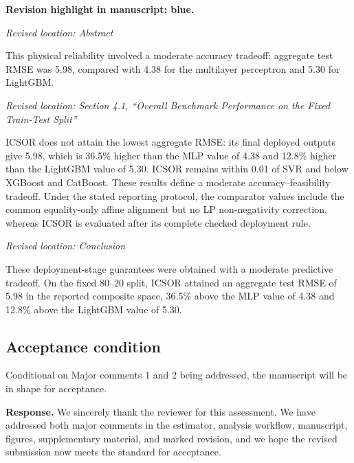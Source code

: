 \documentclass[11pt,a4paper]{article}
\newcommand{\revisionnotice}{\par\noindent\textcolor{revisionblue}{\textbf{Revision highlight in manuscript: blue.}}\par}
\newcommand{\excerptlocation}[1]{\par\noindent\textit{Revised location: #1}\par}
\begin{document}
\revisionnotice

\excerptlocation{Abstract}
\begin{revisionexcerpt}
This physical reliability involved a moderate accuracy tradeoff: aggregate test RMSE was 5.98, compared with 4.38 for the multilayer perceptron and 5.30 for LightGBM.
\end{revisionexcerpt}

\excerptlocation{Section 4.1, ``Overall Benchmark Performance on the Fixed Train-Test Split''}
\begin{revisionexcerpt}
ICSOR does not attain the lowest aggregate RMSE: its final deployed outputs give 5.98, which is 36.5\% higher than the MLP value of 4.38 and 12.8\% higher than the LightGBM value of 5.30. ICSOR remains within 0.01 of SVR and below XGBoost and CatBoost. These results define a moderate accuracy--feasibility tradeoff. Under the stated reporting protocol, the comparator values include the common equality-only affine alignment but no LP non-negativity correction, whereas ICSOR is evaluated after its complete checked deployment rule.
\end{revisionexcerpt}

\excerptlocation{Conclusion}
\begin{revisionexcerpt}
These deployment-stage guarantees were obtained with a moderate predictive tradeoff. On the fixed 80--20 split, ICSOR attained an aggregate test RMSE of 5.98 in the reported composite space, 36.5\% above the MLP value of 4.38 and 12.8\% above the LightGBM value of 5.30.
\end{revisionexcerpt}

\subsection*{Acceptance condition}

\begin{reviewercomment}
Conditional on Major comments 1 and 2 being addressed, the manuscript will be in shape for acceptance.
\end{reviewercomment}

\noindent\textbf{Response.} We sincerely thank the reviewer for this assessment. We have addressed both major comments in the estimator, analysis workflow, manuscript, figures, supplementary material, and marked revision, and we hope the revised submission now meets the standard for acceptance.
\end{document}
